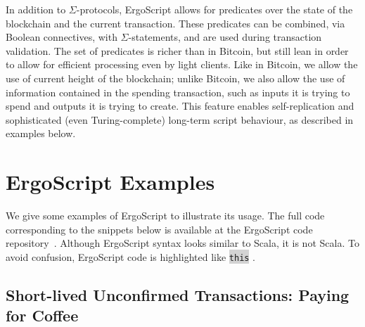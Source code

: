\documentclass[11pt]{article}
\newcommand\Hi[2][lightgray]{%
	\hspace*{-\fboxsep}%
	\colorbox{#1}{#2}%
	\hspace*{-\fboxsep}%
}
\newcommand{\authnote}[2]{\marginpar{\parbox{\marginparwidth}{\tiny %
  \textsf{#1 {\textcolor{blue}{notes: #2}}}}}%
  \textcolor{blue}{\textbf{\dag}}}
\newcommand{\authnote}[2]{
  \textsf{#1 \textcolor{blue}{: #2}}}
\newcommand{\authnote}[2]{}
\newcommand{\lnote}[1]{{\authnote{\textcolor{orange}{Leo notes}}{#1}}}
\newcommand{\snote}[1]{{\authnote{\textcolor{yellow}{Scalahub notes}}{#1}}}
\newcommand{\langname}{ErgoScript\xspace}
\begin{document}
In addition to $\Sigma$-protocols, \langname allows for predicates over the state of the blockchain and the current transaction. These predicates can be combined, via Boolean connectives, with $\Sigma$-statements, and are used during transaction validation. The set of predicates is richer than in Bitcoin, but still lean in order to allow for efficient processing even by light clients. Like in Bitcoin, we allow the use of current height of the blockchain; unlike Bitcoin, we also allow the use of information contained in the spending transaction, such as inputs it is trying to spend and outputs it is trying to create. This feature enables self-replication and sophisticated (even Turing-complete) long-term script behaviour, as described in examples below.





\section{\langname Examples}

We give some examples of \langname to illustrate its usage. The full code corresponding to the snippets below is available at the \langname code repository~\cite{langrepo}. 
Although \langname syntax looks similar to Scala, it is not Scala. To avoid confusion, \langname code is highlighted like \Hi{\texttt{this}}. 

\subsection{Short-lived Unconfirmed Transactions: Paying for Coffee}
\end{document}
